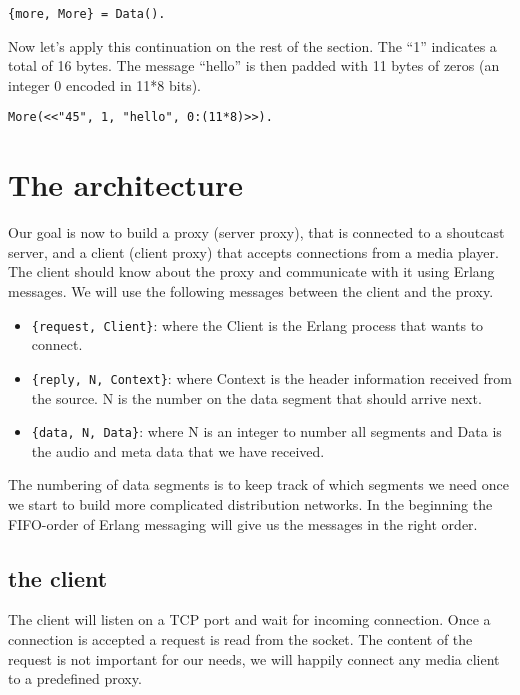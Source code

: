 \documentclass[a4paper,11pt]{article}
\begin{document}
\begin{verbatim}
{more, More} = Data().
\end{verbatim}

Now let's apply this continuation on the rest of the section. The
``1'' indicates a total of 16 bytes. The message ``hello'' is then
padded with 11 bytes of zeros (an integer 0 encoded in 11*8 bits).

\begin{verbatim}
More(<<"45", 1, "hello", 0:(11*8)>>).
\end{verbatim}


\section{The architecture}

Our goal is now to build a proxy (server proxy), that is connected to
a shoutcast server, and a client (client proxy) that accepts
connections from a media player. The client should know about the
proxy and communicate with it using Erlang messages. We will use the
following messages between the client and the proxy.

\begin{itemize}
\item {\tt \{request, Client\}}: where the Client is the Erlang
  process that wants to connect.

\item {\tt \{reply, N, Context\}}: where Context is the header
  information received from the source. N is the number on the data
  segment that should arrive next.

\item {\tt \{data, N, Data\}}: where N is an integer to number all
  segments and Data is the audio and meta data that we have received. 
\end{itemize}

The numbering of data segments is to keep track of which segments we
need once we start to build more complicated distribution networks. In
the beginning the FIFO-order of Erlang messaging will give us the
messages in the right order.

\subsection{the client}

The client will listen on a TCP port and wait for incoming
connection. Once a connection is accepted a request is read from the
socket. The content of the request is not important for our needs, we
will happily connect any media client to a predefined proxy. 
\end{document}
